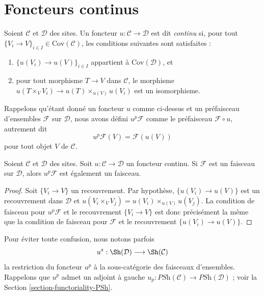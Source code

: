 \section{Foncteurs continus}
\label{section-continuous-functors}

\begin{definition}
\label{definition-continuous}
Soient $\mathcal{C}$ et $\mathcal{D}$ des sites.
Un foncteur $u : \mathcal{C} \to \mathcal{D}$ est dit
{\it continu} si, pour tout
$\{V_i \to V\}_{i\in I} \in \text{Cov}(\mathcal{C})$,
les conditions suivantes sont satisfaites :
\begin{enumerate}
\item $\{u(V_i) \to u(V)\}_{i\in I}$ appartient à $\text{Cov}(\mathcal{D})$, et
\item pour tout morphisme $T \to V$ dans $\mathcal{C}$, le morphisme
$u(T \times_V V_i) \to u(T) \times_{u(V)} u(V_i)$ est un isomorphisme.
\end{enumerate}
\end{definition}

\noindent
Rappelons qu’étant donné un foncteur $u$ comme ci-dessus et un préfaisceau d’ensembles
$\mathcal{F}$ sur $\mathcal{D}$, nous avons défini
$u^p\mathcal{F}$ comme le préfaisceau
$\mathcal{F} \circ u$, autrement dit
$$
u^p\mathcal{F} (V) = \mathcal{F}(u(V))
$$
pour tout objet $V$ de $\mathcal{C}$.

\begin{lemma}
\label{lemma-pushforward-sheaf}
Soient $\mathcal{C}$ et $\mathcal{D}$ des sites.
Soit $u : \mathcal{C} \to \mathcal{D}$ un foncteur continu.
Si $\mathcal{F}$ est un faisceau sur $\mathcal{D}$, alors
$u^p\mathcal{F}$ est également un faisceau.
\end{lemma}

\begin{proof}
Soit $\{V_i \to V\}$ un recouvrement.
Par hypothèse, $\{u(V_i) \to u(V)\}$ est un recouvrement
dans $\mathcal{D}$ et $u(V_i \times_V V_j) =
u(V_i)\times_{u(V)}u(V_j)$. La condition de faisceau pour
$u^p\mathcal{F}$ et le recouvrement $\{V_i \to V\}$
est donc précisément la même que la condition de faisceau pour $\mathcal{F}$
et le recouvrement $\{u(V_i) \to u(V)\}$.
\end{proof}

\noindent
Pour éviter toute confusion, nous notons parfois
$$
u^s :
\Sh(\mathcal{D})
\longrightarrow
\Sh(\mathcal{C})
$$
la restriction du foncteur $u^p$ à la sous-catégorie des faisceaux d’ensembles.
Rappelons que $u^p$ admet un adjoint à gauche
$u_p : \textit{PSh}(\mathcal{C}) \to \textit{PSh}(\mathcal{D})$ ; voir
la Section \ref{section-functoriality-PSh}.

